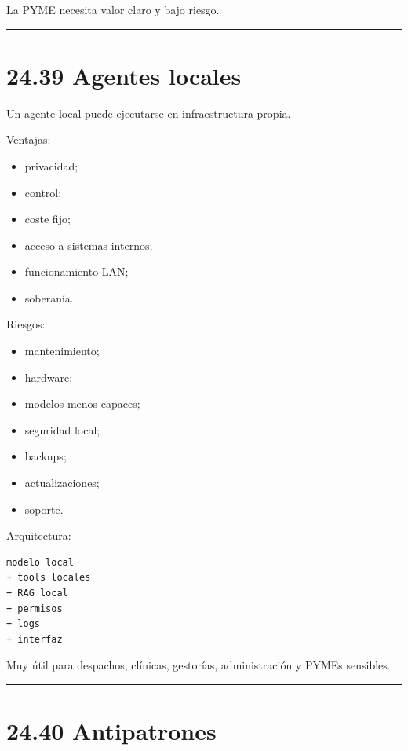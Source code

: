 La PYME necesita valor claro y bajo riesgo.

\begin{center}\rule{0.5\linewidth}{0.5pt}\end{center}

\section{24.39 Agentes locales}\label{agentes-locales}

Un agente local puede ejecutarse en infraestructura propia.

Ventajas:

\begin{itemize}
\tightlist
\item
  privacidad;
\item
  control;
\item
  coste fijo;
\item
  acceso a sistemas internos;
\item
  funcionamiento LAN;
\item
  soberanía.
\end{itemize}

Riesgos:

\begin{itemize}
\tightlist
\item
  mantenimiento;
\item
  hardware;
\item
  modelos menos capaces;
\item
  seguridad local;
\item
  backups;
\item
  actualizaciones;
\item
  soporte.
\end{itemize}

Arquitectura:

\begin{lstlisting}
modelo local
+ tools locales
+ RAG local
+ permisos
+ logs
+ interfaz
\end{lstlisting}

Muy útil para despachos, clínicas, gestorías, administración y PYMEs
sensibles.

\begin{center}\rule{0.5\linewidth}{0.5pt}\end{center}

\section{24.40 Antipatrones}\label{antipatrones-13}

